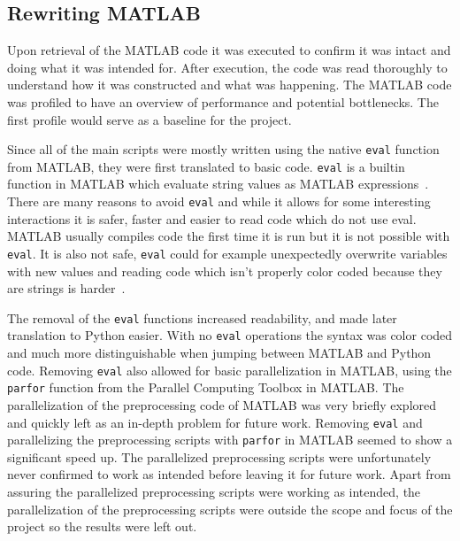 \documentclass[12pt, a4paper]{article}
\begin{document}
\subsection{Rewriting MATLAB}

Upon retrieval of the MATLAB code it was executed to confirm it was intact and doing what it was intended for. 
After execution, the code was read thoroughly to understand how it was constructed and what was happening.
The MATLAB code was profiled to have an overview of performance and potential bottlenecks.
The first profile would serve as a baseline for the project.

Since all of the main scripts were mostly written using the native \texttt{eval} function from MATLAB, they were first translated to basic code.
\texttt{eval} is a builtin function in MATLAB which evaluate string values as MATLAB expressions~\cite{mat:eval}.
There are many reasons to avoid \texttt{eval} and while it allows for some interesting interactions it is safer, faster and easier to read code which do not use eval.
MATLAB usually compiles code the first time it is run but it is not possible with \texttt{eval}.
It is also not safe, \texttt{eval} could for example unexpectedly overwrite variables with new values and reading code which isn't properly color coded because they are strings is harder~\cite{matEval}.

The removal of the \texttt{eval} functions increased readability, and made later translation to Python easier. With no \texttt{eval} operations the syntax was color coded and much more distinguishable when jumping between MATLAB and Python code.
Removing \texttt{eval} also allowed for basic parallelization in MATLAB, using the \texttt{parfor} function from the Parallel Computing Toolbox in MATLAB.
The parallelization of the preprocessing code of MATLAB was very briefly explored and quickly left as an in-depth problem for future work.
Removing \texttt{eval} and parallelizing the preprocessing scripts with \texttt{parfor} in MATLAB seemed to show a significant speed up.
The parallelized preprocessing scripts were unfortunately never confirmed to work as intended before leaving it for future work.
Apart from assuring the parallelized preprocessing scripts were working as intended, the parallelization of the preprocessing scripts were outside the scope and focus of the project so the results were left out.
\end{document}
